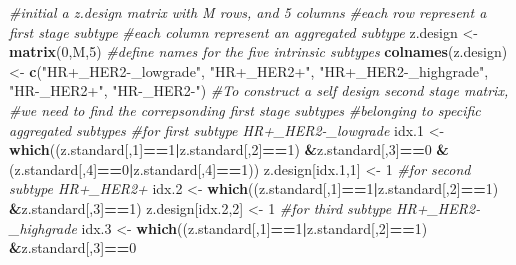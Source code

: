 \documentclass[11pt,]{article}
\newenvironment{Shaded}{\begin{snugshade}}{\end{snugshade}}
\newcommand{\KeywordTok}[1]{\textcolor[rgb]{0.13,0.29,0.53}{\textbf{#1}}}
\newcommand{\DecValTok}[1]{\textcolor[rgb]{0.00,0.00,0.81}{#1}}
\newcommand{\StringTok}[1]{\textcolor[rgb]{0.31,0.60,0.02}{#1}}
\newcommand{\CommentTok}[1]{\textcolor[rgb]{0.56,0.35,0.01}{\textit{#1}}}
\newcommand{\OperatorTok}[1]{\textcolor[rgb]{0.81,0.36,0.00}{\textbf{#1}}}
\newcommand{\NormalTok}[1]{#1}
\begin{document}
\begin{Shaded}
\begin{Highlighting}[]
\CommentTok{#initial a z.design matrix with M rows, and 5 columns}
\CommentTok{#each row represent a first stage subtype}
\CommentTok{#each column represent an aggregated subtype}
\NormalTok{z.design <-}\StringTok{ }\KeywordTok{matrix}\NormalTok{(}\DecValTok{0}\NormalTok{,M,}\DecValTok{5}\NormalTok{)}
\CommentTok{#define names for the five intrinsic subtypes}
\KeywordTok{colnames}\NormalTok{(z.design) <-}\StringTok{ }\KeywordTok{c}\NormalTok{(}\StringTok{"HR+_HER2-_lowgrade"}\NormalTok{,}
                        \StringTok{"HR+_HER2+"}\NormalTok{,}
                        \StringTok{"HR+_HER2-_highgrade"}\NormalTok{,}
                        \StringTok{"HR-_HER2+"}\NormalTok{, }
                        \StringTok{"HR-_HER2-"}\NormalTok{)}
\CommentTok{#To construct a self design second stage matrix,}
\CommentTok{#we need to find the correpsonding first stage subtypes}
\CommentTok{#belonging to specific aggregated subtypes}
\CommentTok{#for first subtype HR+_HER2-_lowgrade}
\NormalTok{idx.}\DecValTok{1}\NormalTok{ <-}\StringTok{ }\KeywordTok{which}\NormalTok{((z.standard[,}\DecValTok{1}\NormalTok{]}\OperatorTok{==}\DecValTok{1}\OperatorTok{|}\NormalTok{z.standard[,}\DecValTok{2}\NormalTok{]}\OperatorTok{==}\DecValTok{1}\NormalTok{)}
               \OperatorTok{&}\NormalTok{z.standard[,}\DecValTok{3}\NormalTok{]}\OperatorTok{==}\DecValTok{0}
               \OperatorTok{&}\NormalTok{(z.standard[,}\DecValTok{4}\NormalTok{]}\OperatorTok{==}\DecValTok{0}\OperatorTok{|}\NormalTok{z.standard[,}\DecValTok{4}\NormalTok{]}\OperatorTok{==}\DecValTok{1}\NormalTok{))}
\NormalTok{z.design[idx.}\DecValTok{1}\NormalTok{,}\DecValTok{1}\NormalTok{] <-}\StringTok{ }\DecValTok{1}
\CommentTok{#for second subtype HR+_HER2+}
\NormalTok{idx.}\DecValTok{2}\NormalTok{ <-}\StringTok{ }\KeywordTok{which}\NormalTok{((z.standard[,}\DecValTok{1}\NormalTok{]}\OperatorTok{==}\DecValTok{1}\OperatorTok{|}\NormalTok{z.standard[,}\DecValTok{2}\NormalTok{]}\OperatorTok{==}\DecValTok{1}\NormalTok{)}
               \OperatorTok{&}\NormalTok{z.standard[,}\DecValTok{3}\NormalTok{]}\OperatorTok{==}\DecValTok{1}\NormalTok{)}
\NormalTok{z.design[idx.}\DecValTok{2}\NormalTok{,}\DecValTok{2}\NormalTok{] <-}\StringTok{ }\DecValTok{1}
\CommentTok{#for third subtype HR+_HER2-_highgrade}
\NormalTok{idx.}\DecValTok{3}\NormalTok{ <-}\StringTok{ }\KeywordTok{which}\NormalTok{((z.standard[,}\DecValTok{1}\NormalTok{]}\OperatorTok{==}\DecValTok{1}\OperatorTok{|}\NormalTok{z.standard[,}\DecValTok{2}\NormalTok{]}\OperatorTok{==}\DecValTok{1}\NormalTok{)}
               \OperatorTok{&}\NormalTok{z.standard[,}\DecValTok{3}\NormalTok{]}\OperatorTok{==}\DecValTok{0}

\end{Highlighting}
\end{Shaded}
\end{document}
